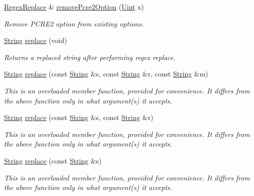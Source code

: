 \begin{DoxyCompactItemize}
\hyperlink{classjpcre2_1_1RegexReplace}{Regex\+Replace} \& \hyperlink{classjpcre2_1_1RegexReplace_adafa76534134e0c9b5342499478fd396}{remove\+Pcre2\+Option} (\hyperlink{namespacejpcre2_a078242d38221a13fb3543b9edd78c099}{Uint} x)
\begin{DoxyCompactList}\small\item\em Remove P\+C\+R\+E2 option from existing options. \end{DoxyCompactList}\item 
\hyperlink{namespacejpcre2_a91f03070152fb228bc116c5a737f1d16}{String} \hyperlink{classjpcre2_1_1RegexReplace_afd087fa7a9bfedec802d1a3dd7edbdd0}{replace} (void)
\begin{DoxyCompactList}\small\item\em Returns a replaced string after performing regex replace. \end{DoxyCompactList}\item 
\hyperlink{namespacejpcre2_a91f03070152fb228bc116c5a737f1d16}{String} \hyperlink{classjpcre2_1_1RegexReplace_a36904dd7340bf23ed138b0379d9eff5f}{replace} (const \hyperlink{namespacejpcre2_a91f03070152fb228bc116c5a737f1d16}{String} \&s, const \hyperlink{namespacejpcre2_a91f03070152fb228bc116c5a737f1d16}{String} \&r, const \hyperlink{namespacejpcre2_a91f03070152fb228bc116c5a737f1d16}{String} \&m)
\begin{DoxyCompactList}\small\item\em This is an overloaded member function, provided for convenience. It differs from the above function only in what argument(s) it accepts. \end{DoxyCompactList}\item 
\hyperlink{namespacejpcre2_a91f03070152fb228bc116c5a737f1d16}{String} \hyperlink{classjpcre2_1_1RegexReplace_a66a7eb99c0068505e7ce0fad8c6179d0}{replace} (const \hyperlink{namespacejpcre2_a91f03070152fb228bc116c5a737f1d16}{String} \&s, const \hyperlink{namespacejpcre2_a91f03070152fb228bc116c5a737f1d16}{String} \&r)
\begin{DoxyCompactList}\small\item\em This is an overloaded member function, provided for convenience. It differs from the above function only in what argument(s) it accepts. \end{DoxyCompactList}\item 
\hyperlink{namespacejpcre2_a91f03070152fb228bc116c5a737f1d16}{String} \hyperlink{classjpcre2_1_1RegexReplace_a4b6df93ba03638b58f658a69ebb6326d}{replace} (const \hyperlink{namespacejpcre2_a91f03070152fb228bc116c5a737f1d16}{String} \&s)
\begin{DoxyCompactList}\small\item\em This is an overloaded member function, provided for convenience. It differs from the above function only in what argument(s) it accepts. \end{DoxyCompactList}\end{DoxyCompactItemize}
